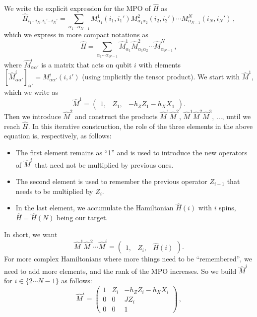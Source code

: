 \documentclass{SciPost}
\begin{document}
We write the explicit expression for the MPO of $\hat H$ as
\begin{equation}
\hat H_{i_1\cdots{}i_N;i_1'\cdots{}i_N'} = \sum_{\alpha_1\cdots{}\alpha_{N-1}} M^1_{\alpha_1}(i_1,i_1')
M^2_{\alpha_1\alpha_2}(i_2,i_2')\cdots{}
M^N_{\alpha_{N-1}}(i_N,i_N')\,,
\end{equation}
which we express in more compact notations as
\begin{equation}
\hat H = \sum_{\alpha_1\cdots{}\alpha_{N-1}} \hat M^1_{\alpha_1}
\hat M^2_{\alpha_1\alpha_2}\cdots{}
\hat M^N_{\alpha_{N-1}}\,,
\end{equation}
where $\hat M^i_{\alpha\alpha'}$ is a matrix that acts on qubit $i$ with elements
$[\hat M^i_{\alpha\alpha'}]_{ii'} = M^i_{\alpha\alpha'}(i,i')$ (using implicitly the tensor product).  We start with $\hat M^1$, which we write as
\begin{equation}
\hat M^1 =
\begin{pmatrix}
1, & Z_1, & -h_Z Z_1 -h_X X_1
\end{pmatrix}.
\end{equation}
Then we introduce $\hat M^2$ and construct the products $\hat M^1 \hat M^2$, $\hat M^1 \hat M^2 \hat M^3$, $\dots$, until we reach $\hat H$.  In this iterative construction,
the role of the three elements in the above equation is, respectively, as follows:
\begin{itemize}
\item The first element remains as ``1'' and is used to introduce the new operators of $\hat M^i$ that need not be multiplied by previous ones.
\item The second element is used to remember the previous operator $Z_{i-1}$ that needs to be multiplied by $Z_i$.
\item In the last element, we accumulate the Hamiltonian $\hat H(i)$ with $i$ spins,
$\hat H = \hat H(N)$ being our target.
\end{itemize}
In short, we want
\begin{equation}
\label{eq:explicitmpo}
\hat M^1 \hat M^2 \cdots{}\hat M^i =
\begin{pmatrix}
1, & Z_i, & \hat H(i)
\end{pmatrix}.
\end{equation}
For more complex Hamiltonians where more things need to be ``remembered'', we need to add
more elements, and the rank of the MPO increases.  So we build $\hat M^i$ for $i\in\{2\cdots{}N-1\}$ as follows:
\begin{equation}
\hat M^i =
\begin{pmatrix}
1 &  Z_i  &  -h_Z Z_i -h_X X_i  \\
0 &  0    &  J Z_i              \\
0 &  0    &  1
\end{pmatrix}\,,
\end{equation}
\end{document}
